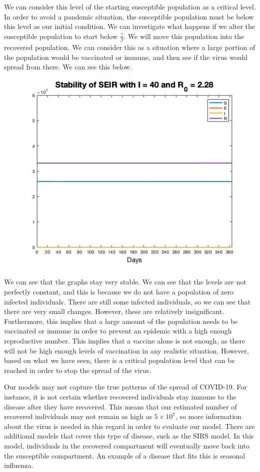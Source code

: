 \documentclass[12pt, a4paper]{article}
\begin{document}
    We can consider this level of the starting susceptible population as a critical level. In order to avoid a pandemic situation, the susceptible population must be below this level as our initial condition. We can investigate what happens if we alter the susceptible population to start below $\frac{\gamma}{\beta}$. We will move this population into the recovered population. We can consider this as a situation where a large portion of the population would be vaccinated or immune, and then see if the virus would spread from there. We can see this below.
    
    \includegraphics[scale=0.75]{plots/i40r228_st.jpg}
    
    We can see that the graphs stay very stable. We can see that the levels are not perfectly constant, and this is because we do not have a population of zero infected individuals. There are still some infected individuals, so we can see that there are very small changes. However, these are relatively insignificant. Furthermore, this implies that a large amount of the population needs to be vaccinated or immune in order to prevent an epidemic with a high enough reproductive number. This implies that a vaccine alone is not enough, as there will not be high enough levels of vaccination in any realistic situation. However, based on what we have seen, there is a critical population level that can be reached in order to stop the spread of the virus.
    
    Our models may not capture the true patterns of the spread of COVID-19. For instance, it is not certain whether recovered individuals stay immune to the disease after they have recovered. This means that our estimated number of recovered individuals may not remain as high as $5 \times 10^7$, so more information about the virus is needed in this regard in order to evaluate our model. There are additional models that cover this type of disease, such as the SIRS model. In this model, individuals in the recovered compartment will eventually move back into the susceptible compartment. An example of a disease that fits this is seasonal influenza.
    
\end{document}
